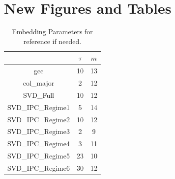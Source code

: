 \documentclass{article}
\begin{document}
\section{New Figures and Tables}




\begin{table}[htdp]
\caption{ Embedding Parameters for reference if needed. }
\begin{center}
\begin{tabular}{|c|c|c|}
\hline
&$\tau$ & $m$ \\
\hline
gcc & 10& 13\\
col\_major  &2&12\\
SVD\_Full &  10  &  12 \\
SVD\_IPC\_Regime1 & 5 &14  \\
SVD\_IPC\_Regime2 & 10   &12  \\
SVD\_IPC\_Regime3 & 2   &9  \\
SVD\_IPC\_Regime4 &  3  & 11 \\
SVD\_IPC\_Regime5 &  23  & 10 \\
SVD\_IPC\_Regime6 &  30  & 12  \\
\hline
\end{tabular}
\end{center}
\label{default}
\end{table}%
\end{document}
